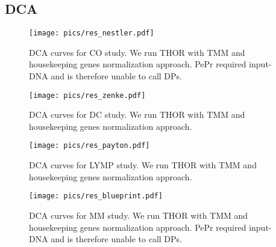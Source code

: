 \clearpage
\newpage

\subsection{DCA}
\begin{figure}[ht]
  \begin{center}
    \texttt{[image: pics/res\_nestler.pdf]}
  \end{center}
\caption[DCA curves for CO study]{DCA curves for CO study. We run THOR with TMM and housekeeping genes normalization approach. PePr required input-DNA and is therefore unable to call DPs.}
\label{fig_dca_curves_co}
\end{figure}

\begin{figure}[ht]
  \begin{center}
    \texttt{[image: pics/res\_zenke.pdf]}
  \end{center}
\caption[DCA curves for DC study]{DCA curves for DC study. We run THOR with TMM and housekeeping genes normalization approach.}
\label{fig_dca_curves_dc}
\end{figure}

\begin{figure}[ht]
  \begin{center}
    \texttt{[image: pics/res\_payton.pdf]}
  \end{center}
\caption[DCA curves for LYMP study]{DCA curves for LYMP study. We run THOR with TMM and housekeeping genes normalization approach.}
\label{fig_dca_curves_lymp}
\end{figure}


\begin{figure}[ht]
  \begin{center}
    \texttt{[image: pics/res\_blueprint.pdf]}
  \end{center}
\caption[DCA curves for MM study]{DCA curves for MM study. We run THOR with TMM and housekeeping genes normalization approach. PePr required input-DNA and is therefore unable to call DPs.}
\label{fig_dca_curves_mm}
\end{figure}


